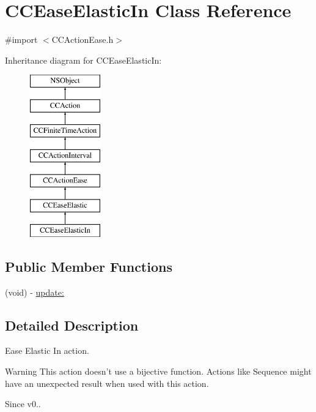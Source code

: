 \hypertarget{interface_c_c_ease_elastic_in}{\section{C\-C\-Ease\-Elastic\-In Class Reference}
\label{interface_c_c_ease_elastic_in}
}


{\ttfamily \#import $<$C\-C\-Action\-Ease.\-h$>$}

Inheritance diagram for C\-C\-Ease\-Elastic\-In\-:\begin{figure}[H]
\begin{center}
\leavevmode
\includegraphics[height=7.000000cm]{interface_c_c_ease_elastic_in}
\end{center}
\end{figure}
\subsection*{Public Member Functions}
\begin{DoxyCompactItemize}
\item 
(void) -\/ \hyperlink{interface_c_c_ease_elastic_in_abea6af2a0240a45f15a81a09b9e454c1}{update\-:}
\end{DoxyCompactItemize}


\subsection{Detailed Description}
Ease Elastic In action. \begin{DoxyWarning}{Warning}
This action doesn't use a bijective function. Actions like Sequence might have an unexpected result when used with this action. 
\end{DoxyWarning}
\begin{DoxySince}{Since}
v0.. 
\end{DoxySince}


